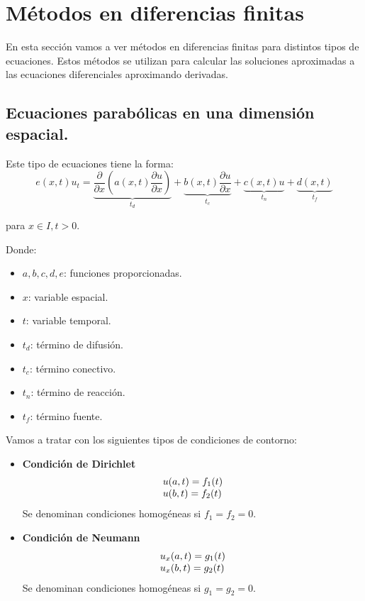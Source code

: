 \section{Métodos en diferencias finitas}
En esta sección vamos a ver métodos en diferencias finitas para distintos tipos de ecuaciones. Estos métodos se utilizan para calcular las soluciones aproximadas a las ecuaciones diferenciales aproximando derivadas.

\subsection{Ecuaciones parabólicas en una dimensión espacial.}
Este tipo de ecuaciones tiene la forma:
$$e(x,t)u_t = \underbrace{\frac{\partial}{\partial x} \left(a(x,t)\frac{\partial u}{\partial x}\right)}_{t_d} + \underbrace{b(x,t)\frac{\partial u}{\partial x}}_{t_c}+\underbrace{c(x,t)u}_{t_n} + \underbrace{d(x,t)}_{t_f}$$
 
para $x\in I, t>0$.

Donde:
\begin{itemize}
	\item $a,b,c,d,e$: funciones proporcionadas.
	\item $x$: variable espacial.
	\item $t$: variable temporal.
	\item $t_d$: término de difusión.
	\item $t_c$: término conectivo.
	\item $t_n$: término de reacción.
	\item $t_f$: término fuente.			
\end{itemize}

Vamos a tratar con los siguientes tipos de condiciones de contorno:
\begin{itemize}
	\item \textbf{Condición de Dirichlet}	
	\begin{equation*}
		\begin{array}{l l}
			u(a,t) = f_1(t)\\
			u(b,t) = f_2(t)\\
		\end{array}
	\end{equation*}
	Se denominan condiciones homogéneas si $f_1=f_2=0$.
	\item \textbf{Condición de Neumann}	
	\begin{equation*}
		\begin{array}{l l}
			u_x(a,t) = g_1(t)\\
			u_x(b,t) = g_2(t)\\
		\end{array}
	\end{equation*}
	Se denominan condiciones homogéneas si $g_1=g_2=0$.
\end{itemize}

